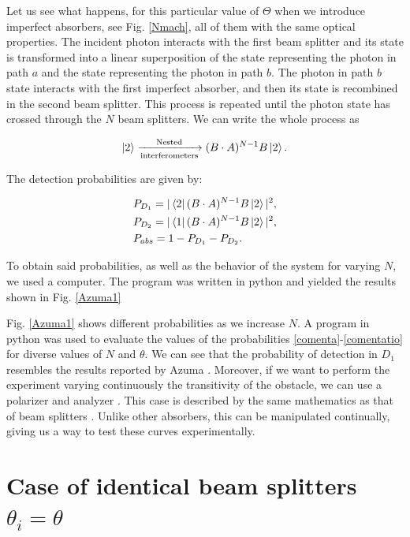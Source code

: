 \documentclass[12pt]{book}
\begin{document}
  Let us see what happens, for this particular value of $\Theta$ when we introduce imperfect absorbers, see Fig. \ref{Nmach}, all of them with the same optical properties. The incident photon interacts with the first beam splitter and its state is transformed into a linear superposition of the state representing the photon in path $a$ and the state representing the photon in path $b$. The photon in path $b$ state interacts with the first imperfect absorber, and then its state is recombined in the second beam splitter. This process is repeated until the photon state has crossed through the $N$ beam splitters. We can write the whole process as 


\begin{equation}\ket{2}\xrightarrow[\text{interferometers}]{\text{Nested}}(B \cdot A)^{N-1}B \ket{2}.
\end{equation}

The detection probabilities are given by:

\begin{align}
&P_{D_{1}}=|\bra{2} (B \cdot A)^{N-1}B \ket{2}|^2,\label{comenta}\\
&P_{D_{2}}=|\bra{1} (B \cdot A)^{N-1}B \ket{2}|^2,\\
&P_{abs}=1-P_{D_{1}}-P_{D_{2}}.
\label{comentatio}
\end{align}
 
 
To obtain said probabilities, as well as the behavior of the system for varying $N$, we used a computer. The program was written in python and yielded the results shown in Fig. \ref{Azuma1}




Fig. \ref{Azuma1} shows  different probabilities as we increase $N$. A program in python was used to evaluate the values of the probabilities \ref{comenta}-\ref{comentatio} for diverse values of $N$ and $\theta$. We can see that the probability of detection in $D_{1}$ resembles the results reported by Azuma \cite{Azuma}. Moreover, if we want to perform the experiment varying continuously the transitivity of the obstacle, we can use a polarizer and analyzer \cite{nosirve}.  This case is described by the same mathematics as that of beam splitters \cite{nosirve}. Unlike other absorbers, this can be manipulated continually, giving us a way to test these curves experimentally. 



 \section{Case of identical beam splitters $\theta_{i}=\theta$}
 
\end{document}
